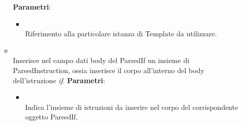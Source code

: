 \begin{itemize}
\begin{itemize}
\textbf{Parametri}:
\begin{itemize}
\item {}
\\ Riferimento alla particolare istanza di Template da utilizzare.
\end{itemize}
\item {}
\\ Inserisce nel campo dati body del ParsedIf un insieme di ParsedInstruction, ossia inserisce il corpo all'interno del body dell'istruzione \emph{if}.
\textbf{Parametri}:
\begin{itemize}
\item {}
\\ Indica l'insieme di istruzioni da inserire nel corpo del corrispondente oggetto ParsedIf.
\end{itemize}
\end{itemize}
\end{itemize}

